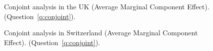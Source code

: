 \begin{figure}[h!]
    \caption[Conjoint analysis in the UK]{Conjoint analysis in the UK (Average Marginal Component Effect). \hfill (Question~\ref{q:conjoint}).
    }\label{fig:conjoint_GB}
\end{figure}

\begin{figure}[h!]
    \caption[Conjoint analysis in Switzerland]{Conjoint analysis in Switzerland (Average Marginal Component Effect). \hfill (Question~\ref{q:conjoint}).
    }\label{fig:conjoint_CH}
\end{figure} 

